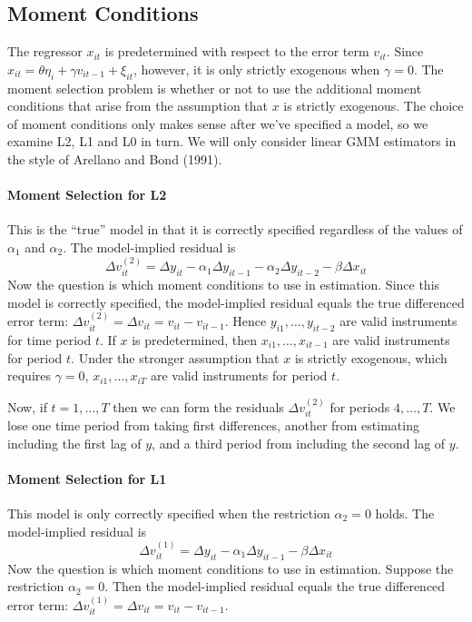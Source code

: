 \documentclass[12pt]{article}
\begin{document}
\subsection{Moment Conditions}
The regressor $x_{it}$ is predetermined with respect to the error term $v_{it}$. Since $x_{it} = \theta \eta_i + \gamma v_{it-1} + \xi_{it}$, however, it is only strictly exogenous when $\gamma=0$. The moment selection problem is whether or not to use the additional moment conditions that arise from the assumption that $x$ is strictly exogenous. The choice of moment conditions only makes sense after we've specified a model, so we examine L2, L1 and L0 in turn. We will only consider linear GMM estimators in the style of Arellano and Bond (1991).

\paragraph{Moment Selection for L2} This is the ``true'' model in that it is correctly specified regardless of the values of $\alpha_1$ and $\alpha_2$. The model-implied residual is
$$\Delta v_{it}^{(2)}=  \Delta y_{it} -  \alpha_1 \Delta y_{it-1} - \alpha_2 \Delta y_{it-2} - \beta \Delta x_{it}$$
Now the question is which moment conditions to use in estimation. Since this model is correctly specified, the model-implied residual equals the true differenced error term: $\Delta v_{it}^{(2)} = \Delta v_{it} = v_{it} - v_{it-1}$. Hence $y_{i1}, \hdots, y_{it-2}$ are valid instruments for time period $t$. If $x$ is predetermined, then $x_{i1}, \hdots, x_{it-1}$ are valid instruments for period $t$. Under the stronger assumption that $x$ is strictly exogenous, which requires $\gamma=0$, $x_{i1}, \hdots, x_{iT}$ are valid instruments for period $t$.




Now, if $t = 1, \hdots, T$ then we can form the residuals $\Delta v_{it}^{(2)}$ for periods $4, \hdots, T$. We lose one time period from taking first differences, another from estimating including the first lag of $y$, and a third period from including the second lag of $y$.



\paragraph{Moment Selection for L1} This model is only correctly specified when the restriction $\alpha_2 = 0$ holds. The model-implied residual is
$$\Delta v_{it}^{(1)}= \Delta y_{it} -  \alpha_1 \Delta y_{it-1} -\beta \Delta x_{it}$$
Now the question is which moment conditions to use in estimation. Suppose the restriction $\alpha_2 = 0$. Then the model-implied residual equals the true differenced error term: $\Delta v_{it}^{(1)} = \Delta v_{it}= v_{it} - v_{it-1}$. 
\end{document}
